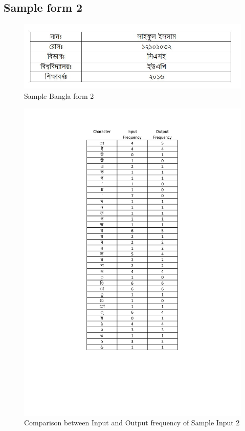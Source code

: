 \subsection{Sample form 2}
\begin{figure}[H]
\centering
\includegraphics[width=1\textwidth]{formBen02.JPG}
\caption {Sample Bangla form 2}
\label {fig:FormBan2}
\end{figure}
\begin{figure}[H]
\centering
\includegraphics[width=1\textwidth \frame]{BTform2}
\caption {Comparison between Input and Output frequency of Sample Input 2}
\label {fig:BTform2}
\end{figure}
